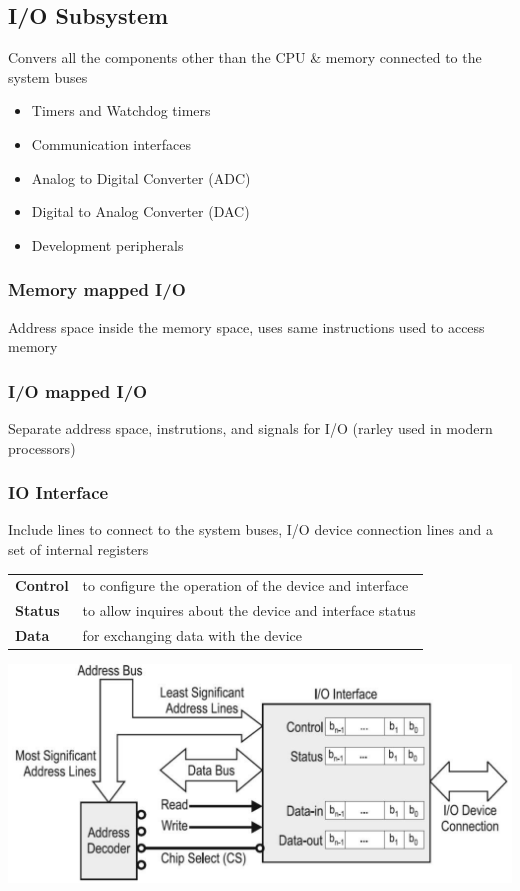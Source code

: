 \subsection{I/O Subsystem }
Convers all the components other than the CPU \& memory connected to the system buses
\begin{itemize}
	\item Timers and Watchdog timers
	\item Communication interfaces
	\item Analog to Digital Converter (ADC)
	\item Digital to Analog Converter (DAC)
	\item Development peripherals
\end{itemize}
\begin{multicols}{2}
	\begin{minipage}{\linewidth}
		\subsubsection{Memory mapped I/O}
		Address space inside the memory space, uses same instructions used to access memory
	\end{minipage}
	
	\begin{minipage}{\linewidth}
		\subsubsection{I/O mapped I/O}
		Separate address space, instrutions, and signals for I/O (rarley used in modern processors)
	\end{minipage}
\end{multicols}
\begin{minipage}{0.6\linewidth}
	\subsubsection{IO Interface}
	\raggedright
	Include lines to connect to the system buses, I/O device connection lines and a set of internal registers
	\begin{tabular}{ll}
		\textbf{Control}  & to configure the operation of the device and interface  \\  
		\textbf{Status}   & to allow inquires about the device and interface status  \\ 
		\textbf{Data}     & for exchanging data with the device \\ 
	\end{tabular} 
\end{minipage}
\begin{minipage}{0.4\linewidth}
	\includegraphics[width=\linewidth]{images/IOAnatomy} 
\end{minipage}

\clearpage
